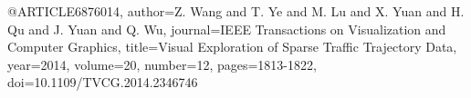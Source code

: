 @ARTICLE{6876014,
  author={Z. {Wang} and T. {Ye} and M. {Lu} and X. {Yuan} and H. {Qu} and J. {Yuan} and Q. {Wu}},
  journal={IEEE Transactions on Visualization and Computer Graphics}, 
  title={Visual Exploration of Sparse Traffic Trajectory Data}, 
  year={2014},
  volume={20},
  number={12},
  pages={1813-1822},
  doi={10.1109/TVCG.2014.2346746}}